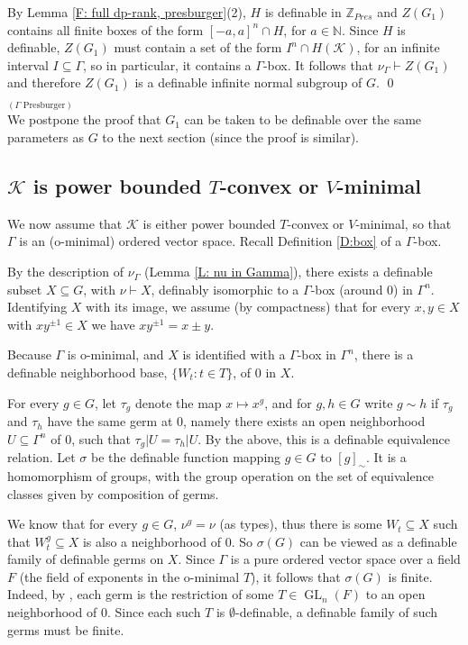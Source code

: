 \documentclass[11pt]{amsart}
\DeclareMathOperator{\gl}{GL} \DeclareMathOperator{\agl}{AGL}
\theoremstyle{definition}
\newcommand{\Zz}{{\mathbb {Z}}}
\newcommand{\CK}{{\mathcal K}}
\newcommand{\0}{\emptyset}
\def\sub{\subseteq}
\begin{document}
    By Lemma \ref{F: full dp-rank, presburger}(2), $H$ is definable in $\Zz_{Pres}$ and  $Z(G_1)$ contains all finite boxes of the form $[-a,a]^n\cap H$, for $a\in \mathbb N$. Since $H$ is definable, $Z(G_1)$ must contain a set of the form $I^n\cap H(\CK)$, for an infinite interval $I\sub \Gamma$, so in particular, it contains a  $\Gamma$-box. It follows that $\nu_{\Gamma}\vdash Z(G_1)$ and therefore $Z(G_1)$ is a definable infinite normal subgroup of $G$. \qed$_{(\Gamma\text{ Presburger})}$\\

    We postpone the proof that $G_1$ can be taken to be definable over the same parameters as $G$ to the next section (since the proof is similar). 

\subsection{$\CK$ is power bounded $T$-convex or $V$-minimal}
We now assume that  $\CK$ is either power bounded $T$-convex or $V$-minimal, so that $\Gamma$ is an (o-minimal) ordered vector space. Recall  Definition \ref{D:box} of a $\Gamma$-box.



  By the description of $\nu_\Gamma$ (Lemma \ref{L: nu in Gamma}), there exists a definable subset $X\subseteq G$, with $\nu\vdash X$, definably isomorphic to a $\Gamma$-box (around $0$) in $\Gamma^n$. 
  Identifying $X$ with its image, we assume (by compactness) that for every $x,y\in X$ with $xy^{\pm 1} \in X$ we have  $xy^{\pm 1}=x\pm y$. 
  
  Because $\Gamma$ is o-minimal, and $X$ is identified with a $\Gamma$-box in $\Gamma^n$,  there is a definable neighborhood base, $\{W_t: t\in T\}$, of $0$ in $X$. 
  
  For every $g\in G$, let $\tau_g$ denote the map $x\mapsto x^g$, and for $g,h\in G$ write $g\sim h$ if $\tau_g$ and $\tau_h$ have the same germ at $0$, namely there exists an open neighborhood $U\sub \Gamma^n$ of $0$, such that $\tau_g|U=\tau_h|U$. By the above, this is a definable equivalence relation. 
Let $\sigma$ be the definable function mapping $g\in G$ to $[g]_\sim$. It is a homomorphism of groups, with the group operation on the set of equivalence classes given by composition of germs.

  We know that for every $g\in G$, $\nu^g=\nu$ (as types), thus there is some $W_t\subseteq X$ such that $W_t^g\subseteq X$ is also a neighborhood of $0$. So $\sigma(G)$ can be viewed as a definable family of definable germs on $X$.
Since $\Gamma$ is a pure ordered vector space over a field $F$ (the field of exponents in the o-minimal $T$), it follows  that  $\sigma(G)$ is finite. Indeed, by \cite[\S1.7 Corollary 7.6]{vdDries}, each germ is the restriction of some $T\in \gl_n(F)$ to an open neighborhood of $0$. Since each such $T$ is $\emptyset$-definable, a definable family of such germs must be finite.
\end{document}
